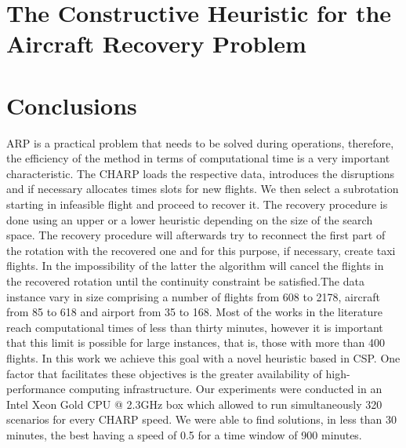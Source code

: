 \documentclass[ijoo,nonblindrev]{informs-ijoo}
\begin{document}
\section{The Constructive Heuristic for the Aircraft Recovery Problem}\label{sec:algorithms}






\section{Conclusions}\label{sec:conclusions}

ARP is a practical problem that needs to be solved during operations, therefore, the efficiency of the method in terms of computational time is a very important characteristic.
The CHARP loads the respective data, introduces the disruptions and if necessary allocates times slots for new flights. We then select a subrotation starting in infeasible flight and proceed to recover it. The recovery procedure is done using an upper or a lower heuristic depending on the size of the search space. The recovery procedure will afterwards try to reconnect the first part of the rotation with the recovered one and for this purpose, if necessary, create taxi flights. In the impossibility of the latter the algorithm will cancel the flights in the recovered rotation until the continuity constraint be satisfied.The data instance vary in size comprising a number of flights from 608 to  2178, aircraft from 85 to 618 and airport from 35 to 168.
 Most of the works in the literature reach computational times of less than thirty minutes, however it is important that this limit is possible for large instances, that is, those with more than 400 flights. In this work we achieve this goal with a novel heuristic based in CSP. One factor that facilitates these objectives is the greater availability of high-performance computing infrastructure. Our experiments were conducted in an Intel Xeon Gold CPU @ 2.3GHz box which allowed to run simultaneously 320 scenarios for every CHARP speed.
We were able to find solutions, in less than 30 minutes, the best having a speed of 0.5 for a time window of 900 minutes. 



%
%
%
\end{document}
